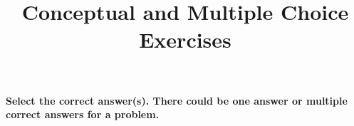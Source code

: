 \documentclass[12pt]{article}
\title{Conceptual and Multiple Choice Exercises}
\author{}
\date{}
\begin{document}
\maketitle


\textbf{Select the correct answer(s). There could be one answer or multiple correct answers for a problem.}
\end{document}
